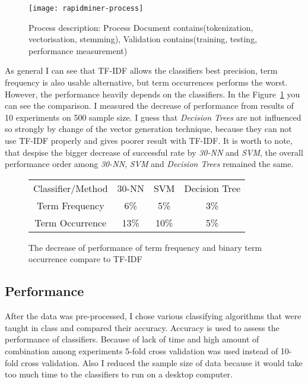 \begin{figure}
\begin{center} 
\texttt{[image: rapidminer-process]}
\caption{Process description: Process Document contains(tokenization, vectorisation, stemming), Validation contains(training, testing, performance measurement)}
\end{center}
\end{figure}
As general I can see that TF-IDF allows the classifiers best precision, term frequency is also usable alternative, but term occurrences performs the worst.
However, the performance heavily depends on the classifiers.
In the Figure~\ref{fig:vectors} you can see the comparison. 
I measured the decrease of performance from results of 10 experiments on 500 sample size.
I guess that {\it Decision Trees} are not influenced so strongly by change of the vector generation
technique, because they can not use TF-IDF properly and gives poorer result with TF-IDF.
It is worth to note, that despise the bigger decrease of successful rate by {\it 30-NN} and {\it SVM},
the overall performance order among {\it 30-NN}, {\it SVM} and {\it Decision Trees} remained the same.
\begin{figure}
\begin{center}
\begin{tabular}{|c|c|c|c|}
\hline
Classifier/Method     & 30-NN  & SVM &  Decision Tree   \\
Term Frequency        & 6\%    & 5\% &    3\%  \\
Term Occurrence       & 13\%   & 10\% &   5\%  \\
\hline
\end{tabular}
\caption{\label{fig:vectors} The decrease of performance of term frequency and binary term occurrence compare to TF-IDF}
\end{center}
\end{figure}

\subsection*{Performance} %
\label{sub:Performance}
 After the data was pre-processed, I chose various classifying algorithms that were taught in class and compared their accuracy. Accuracy is used to assess the performance of classifiers. Because of lack of time and high amount of combination among experiments 5-fold cross validation was used instead of 10-fold cross validation. Also I reduced the sample size of data because it would take too much time to the classifiers to run on a desktop computer.

